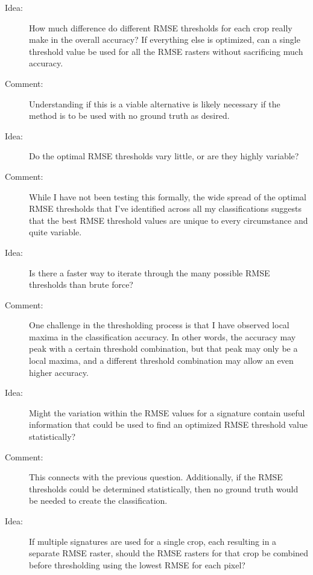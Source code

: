 \begin{description}
\item[Idea:] How much difference do different RMSE thresholds for each crop really make in the overall accuracy? If everything else is optimized, can a single threshold value be used for all the RMSE rasters without sacrificing much accuracy.

\item[Comment:] Understanding if this is a viable alternative is likely necessary if the method is to be used with no ground truth as desired.

\item[Idea:] Do the optimal RMSE thresholds vary little, or are they highly variable?

\item[Comment:] While I have not been testing this formally, the wide spread of the optimal RMSE thresholds that I’ve identified across all my classifications suggests that the best RMSE threshold values are unique to every circumstance and quite variable.

\item[Idea:] Is there a faster way to iterate through the many possible RMSE thresholds than brute force?

\item[Comment:] One challenge in the thresholding process is that I have observed local maxima in the classification accuracy. In other words, the accuracy may peak with a certain threshold combination, but that peak may only be a local maxima, and a different threshold combination may allow an even higher accuracy.

\item[Idea:] Might the variation within the RMSE values for a signature contain useful information that could be used to find an optimized RMSE threshold value statistically?

\item[Comment:] This connects with the previous question. Additionally, if the RMSE thresholds could be determined statistically, then no ground truth would be needed to create the classification.

\item[Idea:] If multiple signatures are used for a single crop, each resulting in a separate RMSE raster, should the RMSE rasters for that crop be combined before thresholding using the lowest RMSE for each pixel?


\end{description}
